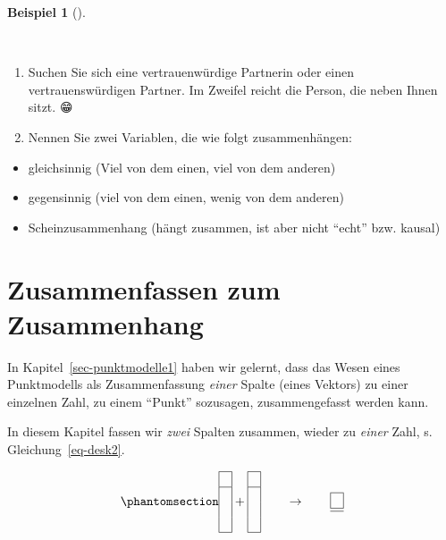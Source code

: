 \documentclass[
  a4paper,
]{scrbook}
\providecommand{\tightlist}{%
  \setlength{\itemsep}{0pt}\setlength{\parskip}{0pt}}\usepackage{longtable,booktabs,array}
\theoremstyle{definition}
\newtheorem{example}{Beispiel}[chapter]
\theoremstyle{definition}
\theoremstyle{definition}
\theoremstyle{remark}
\begin{document}
\begin{example}[]\protect\hypertarget{exm-zsgh-studis}{}\label{exm-zsgh-studis}

~

\begin{enumerate}
\def\labelenumi{\arabic{enumi}.}
\tightlist
\item
  Suchen Sie sich eine vertrauenwürdige Partnerin oder einen
  vertrauenswürdigen Partner. Im Zweifel reicht die Person, die neben
  Ihnen sitzt. {😁}
\item
  Nennen Sie zwei Variablen, die wie folgt zusammenhängen:
\end{enumerate}

\begin{itemize}
\tightlist
\item
  gleichsinnig (Viel von dem einen, viel von dem anderen)
\item
  gegensinnig (viel von dem einen, wenig von dem anderen)
\item
  Scheinzusammenhang (hängt zusammen, ist aber nicht ``echt'' bzw.
  kausal)
\end{itemize}

\end{example}

\section{Zusammenfassen zum
Zusammenhang}\label{zusammenfassen-zum-zusammenhang}

In Kapitel~\ref{sec-punktmodelle1} haben wir gelernt, dass das Wesen
eines Punktmodells als Zusammenfassung \emph{einer} Spalte (eines
Vektors) zu einer einzelnen Zahl, zu einem ``Punkt'' sozusagen,
zusammengefasst werden kann.

In diesem Kapitel fassen wir \emph{zwei} Spalten zusammen, wieder zu
\emph{einer} Zahl, s. Gleichung~\ref{eq-desk2}.

\begin{equation}\phantomsection\label{eq-desk2}{\begin{array}{|c|} \hline \\ \hline \\\\\\ \hline \end{array} + \begin{array}{|c|} \hline \\ \hline \\\\\\ \hline \end{array} \qquad \rightarrow \qquad \begin{array}{|c|} \hline \\ \hline  \hline \end{array}}\end{equation}
\end{document}
